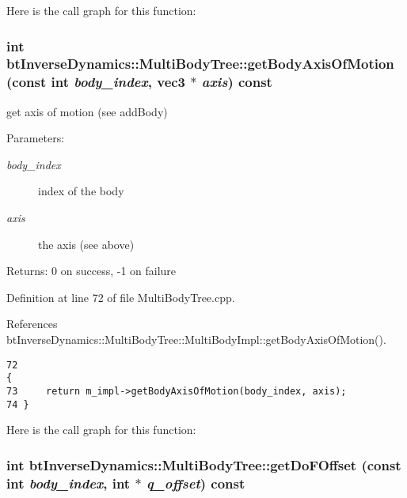 Here is the call graph for this function:\hypertarget{classbt_inverse_dynamics_1_1_multi_body_tree_07d19dbfe7c35c0b455b7d58e9f4b014}{
\subsubsection[getBodyAxisOfMotion]{\setlength{\rightskip}{0pt plus 5cm}int btInverseDynamics::MultiBodyTree::getBodyAxisOfMotion (const int {\em body\_\-index}, \/  {\bf vec3} $\ast$ {\em axis}) const}}
\label{classbt_inverse_dynamics_1_1_multi_body_tree_07d19dbfe7c35c0b455b7d58e9f4b014}


get axis of motion (see addBody) \begin{Desc}
\item[Parameters:]
\begin{description}
\item[{\em body\_\-index}]index of the body \item[{\em axis}]the axis (see above) \end{description}
\end{Desc}
\begin{Desc}
\item[Returns:]0 on success, -1 on failure \end{Desc}


Definition at line 72 of file MultiBodyTree.cpp.

References btInverseDynamics::MultiBodyTree::MultiBodyImpl::getBodyAxisOfMotion().

\begin{Code}\begin{verbatim}72                                                                              {
73     return m_impl->getBodyAxisOfMotion(body_index, axis);
74 }
\end{verbatim}
\end{Code}




Here is the call graph for this function:\hypertarget{classbt_inverse_dynamics_1_1_multi_body_tree_fd9a288177719c951a7b851a6491f308}{
\subsubsection[getDoFOffset]{\setlength{\rightskip}{0pt plus 5cm}int btInverseDynamics::MultiBodyTree::getDoFOffset (const int {\em body\_\-index}, \/  int $\ast$ {\em q\_\-offset}) const}}
\label{classbt_inverse_dynamics_1_1_multi_body_tree_fd9a288177719c951a7b851a6491f308}


